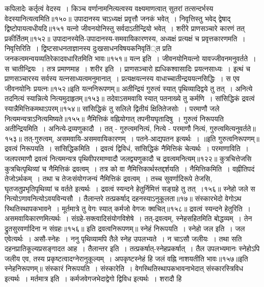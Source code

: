 कपिलादेः कर्तृत्वं वेदस्य~। किञ्च वर्णानामनित्यत्वस्य वक्ष्यमाणत्वात् सुतरां तत्सन्दर्भस्य वेदस्यानित्यत्वमिति॥१५०॥
उपादानस्य चाऽध्यक्षं प्रवृत्तौ जनकं भवेत्~।
निवृत्तिस्तु भवेद् द्वेषाद् द्विष्टोपायत्वधीयदि॥१५१
यत्नो जीवनयोनिस्तु सर्वदाऽतीन्द्रियो भवेत्~।
शरीरे प्राणसञ्चारे कारणं तत् प्रकीर्तितम्॥१५२॥
उपादानस्येति-उपादानस्य-समवायिकारणस्य, अध्यक्षं प्रत्यक्षं च प्रवृत्तकारणमति~।
निवृत्तिरिति~। द्विष्टसाधनताज्ञानस्य दुःखसाधनविषयकनिवृतिं्त प्रति जनकत्वमन्वयव्यतिरेकादवधारितमिति भावः॥१५१॥
यत्न इति~। जीवनयोनियत्नो यावज्जीवनमनुवर्तते~। स चातीन्द्रियः~। तत्र प्रमाणमाह~। शरीर इति~। प्राणसञ्चारो ह्यधिकश्वासादिः प्रयत्नसाध्यः~। इत्थं च प्राणसञ्चारस्य
सर्वस्य यत्नसाध्यत्वमनुमानात्~। प्रत्यक्षयत्नस्य वाधाच्चातीन्द्रययत्नसिद्धिः~। स एव जीवनयोनिः प्रयत्नः॥१५२॥इति यत्ननिरूपणम्॥
अतीन्द्रियं गुरुत्वं स्यात् पृथिव्यादिद्वये तु तत्~।
अनित्ये तदनित्यं स्यान्नित्ये नित्यमुदाहृतम्॥१५३॥
तदेवाऽसमवायि स्यात् पतनाख्ये तु कर्मणि~।
सांसिद्धिकं द्रवत्वं स्यान्नैमित्तिकमथाऽपरम्॥१५४॥
सांसिद्धिकं तु सलिले द्वितीयं क्षितितेजसोः~।
परमाणौ जले नित्यमन्यत्राऽनित्यमिष्यते॥१५५॥
नैमित्तिकं वह्नियोगात् तपनीयघृतादिषु~।
गुरुत्वं निरूपयति अतीन्द्रियमिति~।
अनित्ये-द्रव्यणुकादौ~। तत् - गुरुत्वमनित्यं, नित्ये - परमाणौ नित्यं, गुरुत्वमित्यनुवर्तते॥१५३॥
तत्-गुरुत्वम्, असमवायि-असमवायिकारणम्~। पतने-आद्यपतन इत्यर्थः~।
॥इति गुरुत्वनिरूपणम्॥
द्रवत्वं निरूपयति~। सांसिद्धिकमिति~। द्रवत्वं द्विविधं, सांसिद्धिकं नैमित्तिकं चेत्यर्थः~।
परमाणाविति~। जलपरमाणौ द्रवत्वं नित्यमन्यत्र पृथिवीपरमाण्वादौ जलद्व्यणुकादौ च द्रवत्वमनित्यम्॥१२२॥
कुत्रचित्तेजसि कुत्रचित्पृथिव्यां च नैमित्तिकं द्रवत्वम्~। तत्र को वा नैमित्तिकार्थस्तद्दर्शयति~। नैमित्तिकमिति~। वह्नीतिपदं तेजोऽर्थकम्~। तथा च तेजःसंयोगजन्यं
नैमित्तिकं द्रवत्वम्~। तच्च सुवर्णादिरूपे तेजसि, घृतजतुप्रभृतिपृथिव्यां च वर्तते इत्यर्थः~।
द्रवत्वं स्यन्दने हेतुर्निमित्तं सङ्ग्रहे तु तत्~।१५६॥
स्नेहो जले स नित्योऽणावनित्योऽवयविन्यसौ~।
तैलान्तरे तत्प्रकर्षाद् दहनस्याऽनुकूलता॥१७॥
संस्कारभेदो वेगोऽथ स्थितिस्थापकभावने~।
मूर्तमात्रे तु वेगः स्यात् कर्मजो वेगजः क्वचित्॥१५८॥
द्रवत्वं स्यन्दने हेतुरिति~। असमवायिकारणमित्यर्थः~। संग्रहे-सक्त्वादिसंयोगविशेषे~। तत्-द्रवत्वम्, स्नेहसहितमिति बोद्धव्यम्~। तेन द्रुतसुरवर्णादिना न संग्रहः॥१५६॥
इति द्रवत्वनिरूपणम्॥
स्नेहं निरूपयति~। स्नेहो जल इति~। जल एवेत्यर्थः~। असौ-स्नेहः~। ननु पृथिव्यामपि तैले स्नेह उपलभ्यते~। न चाऽसौ जलीयः~। तथा सति दहनप्रातिकूल्यप्रसङ्गादत
आह~। तैलान्तर इति~। तत्प्रकर्षात्-स्नेहप्रकर्षात्~। तैल उपलभ्यमानः स्नेहोऽपि जलीय एव, तस्य प्रकृष्टत्वादग्नेरानुकूल्यम्~। अपकृष्टस्नेहं हि जलं वह्नि नाशयतीति
भावः॥१५७॥इति स्नेहनिरूपणम्॥
संस्कारं निरूपयति~। संस्कारेति~। वेगस्थितिस्थापकभावनाभेदात् संस्कारस्त्रिविध इत्यर्थः~। मर्तमात्र इति~। कर्मजवेगजभेदाद्वेगो द्विविध इत्यर्थः~। शरादौ हि
